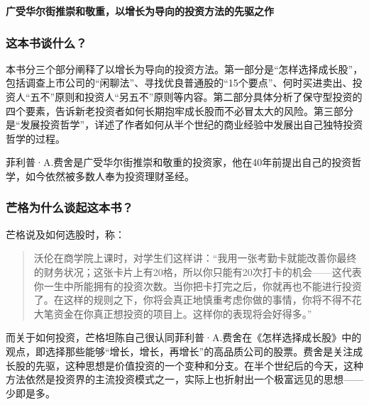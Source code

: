 \cleardoublepage
{}


\begin{BookSummaryBox}
\textbf{广受华尔街推崇和敬重，以增长为导向的投资方法的先驱之作}
\par
\end{BookSummaryBox}

\subsubsection*{这本书谈什么？}

本书分三个部分阐释了以增长为导向的投资方法。第一部分是“怎样选择成长股”，包括调查上市公司的“闲聊法”、寻找优良普通股的“15个要点”、何时买进卖出、投资人“五不”原则和投资人“另五不”原则等内容。第二部分具体分析了保守型投资的四个要素，告诉新老投资者如何长期抱牢成长股而不必冒太大的风险。第三部分是“发展投资哲学”，详述了作者如何从半个世纪的商业经验中发展出自己独特投资哲学的过程。
\par

菲利普·A.费舍是广受华尔街推崇和敬重的投资家，他在40年前提出自己的投资哲学，如今依然被多数人奉为投资理财圣经。
\par

\subsubsection*{芒格为什么谈起这本书？}

芒格说及如何选股时，称：
\par

\begin{quotation}
沃伦在商学院上课时，对学生们这样讲：“我用一张考勤卡就能改善你最终的财务状况；这张卡片上有20格，所以你只能有20次打卡的机会——这代表你一生中所能拥有的投资次数。当你把卡打完之后，你就再也不能进行投资了。在这样的规则之下，你将会真正地慎重考虑你做的事情，你将不得不花大笔资金在你真正想投资的项目上。这样你的表现将会好得多。”
\par
\end{quotation}

而关于如何投资，芒格坦陈自己很认同菲利普·A.费舍在《怎样选择成长股》中的观点，即选择那些能够“增长，增长，再增长”的高品质公司的股票。费舍是关注成长股的先驱，这种思想是价值投资的一个变种和分支。在半个世纪后的今天，这种方法依然是投资界的主流投资模式之一，实际上也折射出一个极富远见的思想——少即是多。
\par

